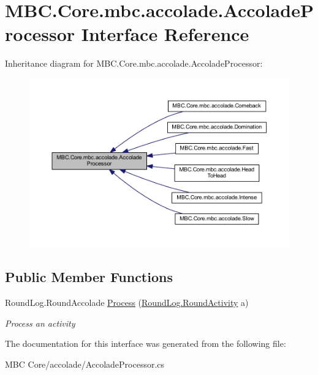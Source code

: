 \hypertarget{interface_m_b_c_1_1_core_1_1mbc_1_1accolade_1_1_accolade_processor}{\section{M\-B\-C.\-Core.\-mbc.\-accolade.\-Accolade\-Processor Interface Reference}
\label{interface_m_b_c_1_1_core_1_1mbc_1_1accolade_1_1_accolade_processor}
}


Inheritance diagram for M\-B\-C.\-Core.\-mbc.\-accolade.\-Accolade\-Processor\-:
\nopagebreak
\begin{figure}[H]
\begin{center}
\leavevmode
\includegraphics[width=350pt]{interface_m_b_c_1_1_core_1_1mbc_1_1accolade_1_1_accolade_processor__inherit__graph}
\end{center}
\end{figure}
\subsection*{Public Member Functions}
\begin{DoxyCompactItemize}
\item 
\hypertarget{interface_m_b_c_1_1_core_1_1mbc_1_1accolade_1_1_accolade_processor_a05f404f33d6ea3c54b6910094b992bac}{Round\-Log.\-Round\-Accolade \hyperlink{interface_m_b_c_1_1_core_1_1mbc_1_1accolade_1_1_accolade_processor_a05f404f33d6ea3c54b6910094b992bac}{Process} (\hyperlink{class_m_b_c_1_1_core_1_1_round_log_1_1_round_activity}{Round\-Log.\-Round\-Activity} a)}\label{interface_m_b_c_1_1_core_1_1mbc_1_1accolade_1_1_accolade_processor_a05f404f33d6ea3c54b6910094b992bac}

\begin{DoxyCompactList}\small\item\em Process an activity\end{DoxyCompactList}\end{DoxyCompactItemize}


The documentation for this interface was generated from the following file\-:\begin{DoxyCompactItemize}
\item 
M\-B\-C Core/accolade/Accolade\-Processor.\-cs\end{DoxyCompactItemize}
